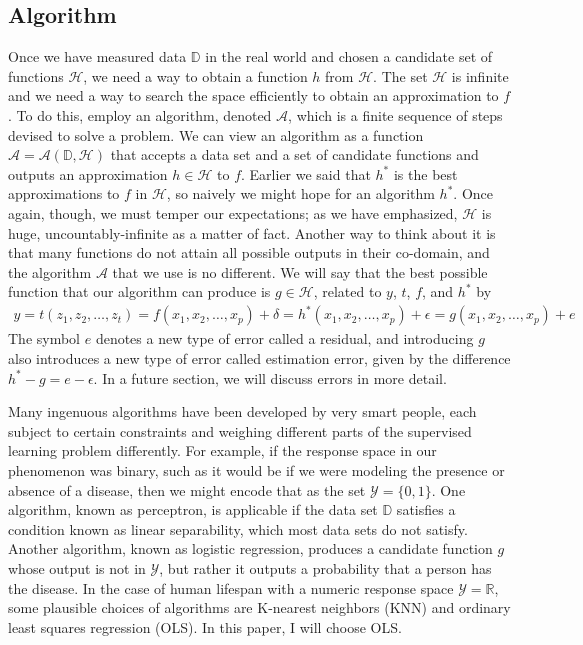 \documentclass[12pt]{article}
\begin{document}
	\subsection{Algorithm}
	Once we have measured data $\mathbb{D}$ in the real world and chosen
	a candidate set of functions $\mathcal{H}$, we need a way to obtain
	a function $h$ from $\mathcal{H}$. The set $\mathcal{H}$ is infinite
	and we need a way to search the space efficiently to obtain an approximation
	to $f$. To do this, employ an algorithm, denoted $\mathcal{A}$, which
	is a finite sequence of steps devised to solve a problem. We can view
	an algorithm as a function $\mathcal{A}=\mathcal{A}(\mathbb{D}, \mathcal{H})$
	that accepts a data set and a set of candidate functions and outputs
	an approximation $h\in\mathcal{H}$ to $f$. Earlier we said that $h^*$ is the
	best approximations to $f$ in $\mathcal{H}$, so naively we might hope for
	an algorithm $h^*$. Once again, though, we must temper our expectations;
	as we have emphasized, $\mathcal{H}$ is huge, uncountably-infinite as
	a matter of fact. Another way to think about it is that many functions
	do not attain all possible outputs in their co-domain, and the algorithm
	$\mathcal{A}$ that we use is no different. We will say that the best
	possible function that our algorithm can produce is $g\in\mathcal{H}$,
	related to $y$, $t$, $f$, and $h^*$ by
	\begin{align*}
		y
		= t(z_1,z_2,\ldots,z_t)
		= f(x_1,x_2,\ldots,x_p) + \delta
		= h^*(x_1,x_2,\ldots,x_p) + \epsilon
		= g(x_1,x_2,\ldots,x_p) + e
	\end{align*}
	The symbol $e$ denotes a new type of error called a residual, and introducing
	$g$ also introduces a new type of error called estimation error, given by
	the difference $h^*-g=e-\epsilon$. In a future section, we will discuss errors
	in more detail.
	
	Many ingenuous algorithms have been developed by very smart people,
	each subject to certain constraints and weighing different parts of the
	supervised learning problem differently. For example, if the response
	space in our phenomenon was binary, such as it would be if we were modeling
	the presence or absence of a disease, then we might encode that as
	the set $\mathcal{Y}=\{0, 1\}$. One algorithm, known as perceptron, is
	applicable if the data set $\mathbb{D}$ satisfies a condition known as
	linear separability, which most data sets do not satisfy. Another algorithm,
	known as logistic regression, produces a candidate function $g$ whose
	output is not in $\mathcal{Y}$, but rather it outputs a probability
	that a person has the disease. In the case of human lifespan with a numeric
	response space $\mathcal{Y}=\mathbb{R}$, some plausible choices of algorithms
	are K-nearest neighbors (KNN) and ordinary least squares regression (OLS).
	In this paper, I will choose OLS.
\end{document}
